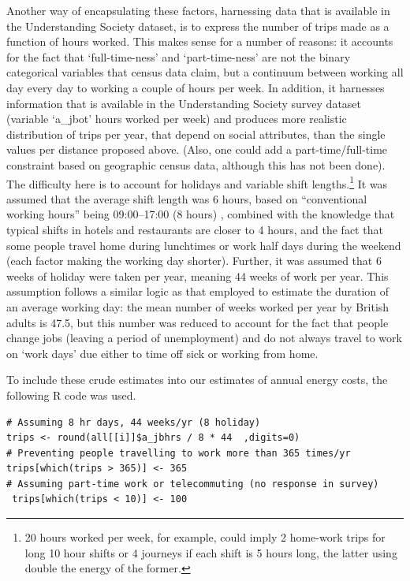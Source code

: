\documentclass[a4paper, 11pt, twoside]{Thesis}
\begin{document}
Another way of encapsulating these
factors, harnessing data that is available in the Understanding Society dataset,
is to express the number of trips made as a function of hours worked.
This makes sense for a number of reasons: it accounts for the fact that
`full-time-ness' and `part-time-ness' are not the binary categorical variables
that census data claim, but a continuum between working all day every day to
working a couple of hours per week. In addition, it harnesses information that
is available in the Understanding Society survey dataset (variable `a\_jbot'
hours worked per week) and produces more realistic distribution of
trips per year, that depend on social attributes,
than the single values per distance proposed above. (Also, one could
add a part-time/full-time constraint based on geographic census data,
although this has not been done).
The difficulty here is to account for holidays and variable shift
lengths.\footnote{20
hours worked per week, for example, could
imply 2 home-work trips for long 10 hour shifts or 4 journeys if each
shift is 5 hours long, the latter using double the energy of the former.
}
It was assumed that the average shift length was 6 hours, based on
``conventional working hours'' being 09:00--17:00 (8 hours)
\citep{harrington2001health}, combined with the knowledge that typical shifts
in hotels and restaurants are closer to 4 hours, and the fact that some people
travel home during lunchtimes or work half days during the weekend (each
factor making the working day shorter).
Further, it was assumed that 6 weeks of holiday were taken per year,
meaning 44 weeks of work per year.
This assumption follows a similar logic as that employed to estimate
the duration of an average working day: the mean number of weeks worked per
year by British adults is 47.5, but this number was reduced to account for
the fact that people change jobs (leaving a period of unemployment) and
do not always travel to work on `work days' due either to time off sick
or working from home.

To include these crude estimates into our estimates of annual energy costs,
the following R code was used.
\begin{lstlisting}[float=h, caption={Code used to
translate hours worked per week into number of trips per year}, label=ctrpyr]
# Assuming 8 hr days, 44 weeks/yr (8 holiday)
trips <- round(all[[i]]$a_jbhrs / 8 * 44  ,digits=0)
# Preventing people travelling to work more than 365 times/yr
trips[which(trips > 365)] <- 365
# Assuming part-time work or telecommuting (no response in survey)
 trips[which(trips < 10)] <- 100
\end{lstlisting}
\end{document}
